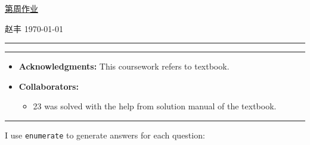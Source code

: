 \documentclass[a4paper]{article}
\begin{document}
\courseheader

\setcounter{hwcnt}{9} %

\begin{center}
  \underline{第\thehwcnt 周作业} \\
\end{center}
\begin{flushleft}
  赵丰\quad \studentID\hfill
  \today
\end{flushleft}
\hrule

\vspace{2em}

\flushleft
\rule{\textwidth}{1pt}
\begin{itemize}
\item {\bf Acknowledgments: \/} 
  This coursework refers to textbook.  
\item {\bf Collaborators: \/}
  \begin{itemize}
  \item 23 was solved with the help from solution manual of the textbook.
  \end{itemize}
\end{itemize}
\rule{\textwidth}{1pt}

\vspace{2em}

I use \texttt{enumerate} to generate answers for each question:
\end{document}
